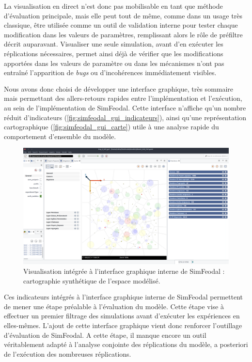 	La visualisation en direct n'est donc pas mobilisable en tant que méthode d'évaluation principale, mais elle peut tout de même, comme dans un usage très classique, être utilisée comme un outil de validation interne pour tester chaque modification dans les valeurs de paramètres, remplissant alors le rôle de \og préfiltre\fg{} décrit auparavant.
	Visualiser une seule simulation, avant d'en exécuter les réplications nécessaires, permet ainsi déjà de vérifier que les modifications apportées dans les valeurs de paramètre ou dans les mécanismes n'ont pas entraîné l'apparition de \textit{bugs} ou d'incohérences immédiatement visibles.

	Nous avons donc choisi de développer une interface graphique, très sommaire mais permettant des allers-retours rapides entre l'implémentation et l'exécution, au sein de l'implémentation de SimFeodal.
	Cette interface n'affiche qu'un nombre réduit d'indicateurs (\autoref{fig:simfeodal_gui_indicateurs}), ainsi qu'une représentation cartographique (\autoref{fig:simfeodal_gui_carte}) utile à une analyse rapide du comportement d'ensemble du modèle.

\begin{figure}[H]
	\captionsetup{width=\linewidth}
	\includegraphics[width=\linewidth]{img/SimFeodal_GUI_carte.png}
	\caption{Visualisation intégrée à l'interface graphique interne de SimFeodal : cartographie synthétique de l'espace modélisé.}
	\label{fig:simfeodal_gui_carte}
\end{figure}

	Ces indicateurs intégrés à l'interface graphique interne de SimFeodal permettent de mener une étape préalable à l'évaluation du modèle.
	Cette étape vise à effectuer un premier filtrage des simulations avant d'exécuter les expériences en elles-mêmes.
	L'ajout de cette interface graphique vient donc renforcer l'outillage d'évaluation de SimFeodal.
	A cette étape, il manque encore un outil véritablement adapté à l'analyse conjointe des réplications du modèle, a posteriori de l'exécution des nombreuses réplications.

